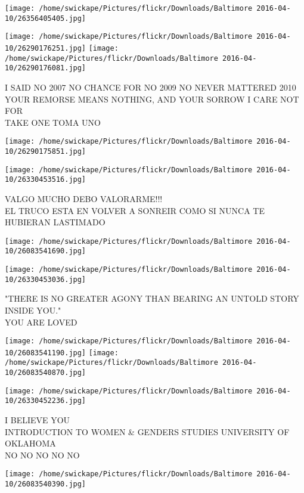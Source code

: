 \documentclass[10pt,letterpaper]{article}
\begin{document}
\texttt{[image: /home/swickape/Pictures/flickr/Downloads/Baltimore 2016-04-10/26356405405.jpg]}

\vspace{0.25in}
\texttt{[image: /home/swickape/Pictures/flickr/Downloads/Baltimore 2016-04-10/26290176251.jpg]}
\texttt{[image: /home/swickape/Pictures/flickr/Downloads/Baltimore 2016-04-10/26290176081.jpg]}

I SAID NO 2007 NO CHANCE FOR NO 2009 NO NEVER MATTERED 2010\\
YOUR REMORSE MEANS NOTHING, AND YOUR SORROW I CARE NOT FOR\\
TAKE ONE TOMA UNO
\pagebreak

\texttt{[image: /home/swickape/Pictures/flickr/Downloads/Baltimore 2016-04-10/26290175851.jpg]}

\vspace{0.25in}
\texttt{[image: /home/swickape/Pictures/flickr/Downloads/Baltimore 2016-04-10/26330453516.jpg]}

VALGO MUCHO DEBO VALORARME!!!\\
EL TRUCO ESTA EN VOLVER A SONREIR COMO SI NUNCA TE HUBIERAN LASTIMADO
\pagebreak

\texttt{[image: /home/swickape/Pictures/flickr/Downloads/Baltimore 2016-04-10/26083541690.jpg]}

\vspace{0.25in}
\texttt{[image: /home/swickape/Pictures/flickr/Downloads/Baltimore 2016-04-10/26330453036.jpg]}

"THERE IS NO GREATER AGONY THAN BEARING AN UNTOLD STORY INSIDE YOU."\\
YOU ARE LOVED
\pagebreak

\texttt{[image: /home/swickape/Pictures/flickr/Downloads/Baltimore 2016-04-10/26083541190.jpg]}
\texttt{[image: /home/swickape/Pictures/flickr/Downloads/Baltimore 2016-04-10/26083540870.jpg]}

\texttt{[image: /home/swickape/Pictures/flickr/Downloads/Baltimore 2016-04-10/26330452236.jpg]}

I BELIEVE YOU\\
INTRODUCTION TO WOMEN \& GENDERS STUDIES UNIVERSITY OF OKLAHOMA\\
NO NO NO NO NO
\pagebreak

\texttt{[image: /home/swickape/Pictures/flickr/Downloads/Baltimore 2016-04-10/26083540390.jpg]}
\end{document}
